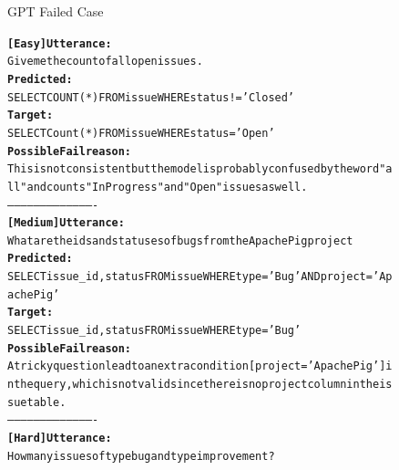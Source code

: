 \begin{figure}[H]
    \begin{AIbox}{GPT Failed Case}
        \vspace{-5px}
        \parbox{1\textwidth}{\scriptsize
            \begin{alltt} \larger
                {\bf [Easy] Utterance:} \\
                Give me the count of all open issues.
                \\
                {\bf Predicted:} \\
                SELECT COUNT(*) FROM issue WHERE status != 'Closed'
                \\
                {\bf Target:} \\
                SELECT Count(*) FROM issue WHERE status = 'Open'
                \\
                {\bf Possible Fail reason:} \\
                This is not consistent but the model is probably confused by the word "all" and counts "In Progress" and "Open" issues as well.
                \\
                ----------------------------------------
                \\
                {\bf [Medium] Utterance:} \\
                What are the ids and statuses of bugs from the Apache Pig project
                \\
                {\bf Predicted:} \\
                SELECT issue\_id, status FROM issue WHERE type = 'Bug' AND project = 'Apache Pig'
                \\
                {\bf Target:} \\
                SELECT issue\_id, status FROM issue WHERE type = 'Bug'
                \\
                {\bf Possible Fail reason:} \\
                A tricky question lead to an extra condition [project = 'Apache Pig'] in the query, which is not valid since there is no project column in the issue table.
                \\
                ----------------------------------------
                \\
                {\bf [Hard] Utterance:} \\
                How many issues of type bug and type improvement?
                \\

\end{alltt}}
\end{AIbox}
\end{figure}
